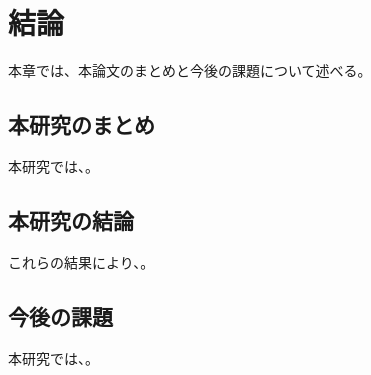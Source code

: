 \chapter{結論}
\label{chap:conclusion}
本章では、本論文のまとめと今後の課題について述べる。

\section{本研究のまとめ}
\label{section:conclusion}
本研究では、。

\section{本研究の結論}
これらの結果により、。

\section{今後の課題}
本研究では、。